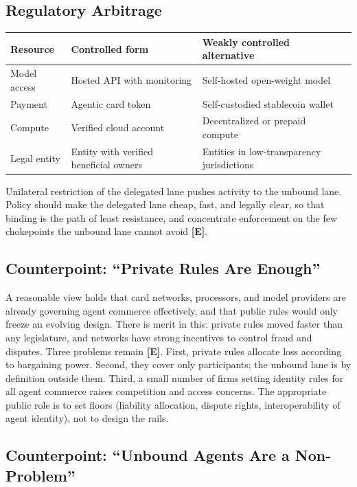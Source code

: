 \documentclass[11pt,letterpaper]{article}
\begin{document}
\subsection{Regulatory Arbitrage}

\begin{center}
\small
\begin{tabularx}{\linewidth}{ZY{0.76}Y{1.04}Y{1.2}}
\toprule
\textbf{Resource} & \textbf{Controlled form} & \textbf{Weakly controlled alternative} \\
\midrule
Model access & Hosted API with monitoring & Self-hosted open-weight model \\
Payment & Agentic card token & Self-custodied stablecoin wallet \\
Compute & Verified cloud account & Decentralized or prepaid compute \\
Legal entity & Entity with verified beneficial owners & Entities in low-transparency jurisdictions \\
\bottomrule
\end{tabularx}
\end{center}

Unilateral restriction of the delegated lane pushes activity to the unbound lane. Policy should make the delegated lane cheap, fast, and legally clear, so that binding is the path of least resistance, and concentrate enforcement on the few chokepoints the unbound lane cannot avoid \textbf{[E]}.

\subsection{Counterpoint: ``Private Rules Are Enough''}

A reasonable view holds that card networks, processors, and model providers are already governing agent commerce effectively, and that public rules would only freeze an evolving design. There is merit in this: private rules moved faster than any legislature, and networks have strong incentives to control fraud and disputes. Three problems remain \textbf{[E]}. First, private rules allocate loss according to bargaining power. Second, they cover only participants; the unbound lane is by definition outside them. Third, a small number of firms setting identity rules for all agent commerce raises competition and access concerns. The appropriate public role is to set floors (liability allocation, dispute rights, interoperability of agent identity), not to design the rails.

\subsection{Counterpoint: ``Unbound Agents Are a Non-Problem''}
\end{document}
